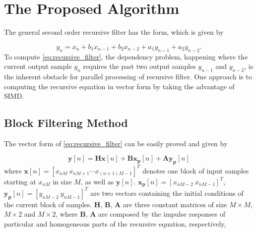 \section{The Proposed Algorithm}
\label{sec:algorithm}

The general second order recursive filter has the form, which is given by

\begin{equation}
    \label{eq:recursive_filter}
    y_n = x_n + b_1x_{n-1} + b_2x_{n-2} + a_1y_{n-1} + a_2y_{n-2}.
\end{equation}
To compute \eqref{eq:recursive_filter}, the dependency problem, happening where the current output sample $y_n$
requires the past two output samples $y_{n-1}$ and $y_{n-2}$, is the inherent obstacle for parallel processing of recursive filter.
One approach is to computing the recursive equation in vector form by taking the advantage of SIMD. 


\subsection{Block Filtering Method}

The vector form of \eqref{eq:recursive_filter} can be easily proved and given by

\begin{equation}
    \label{eq:block_filtering}
    \bm{y}[n] = \bm{H}\bm{x}[n] + \bm{B}\bm{x_p}[n] + \bm{A}\bm{y_p}[n] 
\end{equation}
where $\bm{x}[n] = \left[x_{nM}~x_{nM+1} \cdots x_{(n+1)M-1}\right]^T$ denotes one block of input samples starting at $x_{nM}$ in size $M$,
as well as $\bm{y}[n]$. $\bm{x_p}[n]=\left[x_{nM-2}~x_{nM-1}\right]^T$, $\bm{y_p}[n]=\left[y_{nM-2}~y_{nM-1}\right]^T$ are two vectors 
containing the initial conditions of the current block of samples. 
$\bm{H}$, $\bm{B}$, $\bm{A}$ are three constant matrices of size $M \times M$,
$M \times 2$ and $M \times 2$, 
where $\bm{B}$, $\bm{A}$ are composed by the impulse responses of particular and homogeneous parts of the recursive equation,
respectively, 


